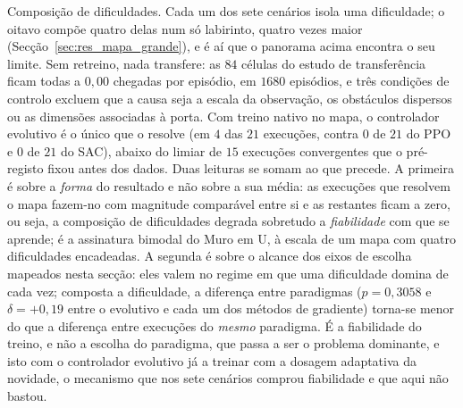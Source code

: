 \documentclass[12pt,reqno, twoside]{amsbook}
\makeatletter
\def\paragraph{\@startsection{paragraph}{4}%
  \z@\z@{-\fontdimen2\font}%
  {\normalfont\bfseries}}
\theoremstyle{plain}
\numberwithin{equation}{chapter}
\numberwithin{section}{chapter}
\numberwithin{table}{chapter}
\numberwithin{figure}{chapter}
\makeatother
\begin{document}
\paragraph{Composição de dificuldades.} Cada um dos sete cenários isola uma dificuldade; o oitavo compõe quatro delas num só labirinto, quatro vezes maior (Secção~\ref{sec:res_mapa_grande}), e é aí que o panorama acima encontra o seu limite. Sem retreino, nada transfere: as $84$ células do estudo de transferência ficam todas a $0{,}00$ chegadas por episódio, em $1680$ episódios, e três condições de controlo excluem que a causa seja a escala da observação, os obstáculos dispersos ou as dimensões associadas à porta. Com treino nativo no mapa, o controlador evolutivo é o único que o resolve (em $4$ das $21$ execuções, contra $0$ de $21$ do PPO e $0$ de $21$ do SAC), abaixo do limiar de $15$ execuções convergentes que o pré-registo fixou antes dos dados. Duas leituras se somam ao que precede. A primeira é sobre a \emph{forma} do resultado e não sobre a sua média: as execuções que resolvem o mapa fazem-no com magnitude comparável entre si e as restantes ficam a zero, ou seja, a composição de dificuldades degrada sobretudo a \emph{fiabilidade} com que se aprende; é a assinatura bimodal do Muro em U, à escala de um mapa com quatro dificuldades encadeadas. A segunda é sobre o alcance dos eixos de escolha mapeados nesta secção: eles valem no regime em que uma dificuldade domina de cada vez; composta a dificuldade, a diferença entre paradigmas ($p = 0{,}3058$ e $\delta = +0{,}19$ entre o evolutivo e cada um dos métodos de gradiente) torna-se menor do que a diferença entre execuções do \emph{mesmo} paradigma. É a fiabilidade do treino, e não a escolha do paradigma, que passa a ser o problema dominante, e isto com o controlador evolutivo já a treinar com a dosagem adaptativa da novidade, o mecanismo que nos sete cenários comprou fiabilidade e que aqui não bastou.
\end{document}
